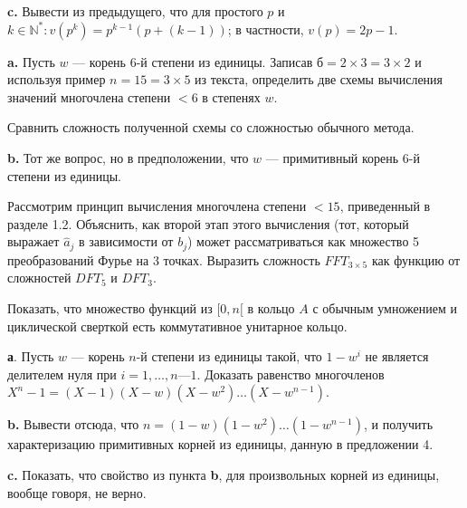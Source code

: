 \documentclass{mai_book}
\begin{document}
{\bf c.} Вывести из предыдущего, что для простого $p$ и $k \in \mathbb N^* : v(p^k) = p^{k-1}(p+(k-1))$; в частности, $v(p)=2p - 1$.

\medskip


\bigskip

{\bf a.} Пусть $w$ — корень 6-й степени из единицы. Записав $б = 2 \times 3 = 3 \times 2$ и используя пример $n = 15 = 3 \times 5$ из текста, определить две схемы вычисления значений многочлена степени $< 6$ в степенях $w$.

Сравнить сложность полученной схемы со сложностью обычного метода.

{\bf b.} Тот же вопрос, но в предположении, что $w$ — примитивный
корень 6-й степени из единицы.

\medskip


\smallskip

Рассмотрим принцип вычисления многочлена степени $< 15$, приведенный в разделе 1.2. Объяснить, как второй этап этого вычисления (тот, который выражает $\hat a_j$ в зависимости от $b_j$) может рассматриваться как множество 5 преобразований Фурье на 3 точках. Выразить сложность $FFT_{3 \times 5}$ как функцию от сложностей $DFT_5$ и $DFT_3$.

\medskip


\smallskip

Показать, что множество функций из $[0, n[$ в кольцо $A$ с обычным
умножением и циклической сверткой есть коммутативное унитарное
кольцо.

\medskip


\smallskip

{\bf а}. Пусть $w$ — корень $n$-й степени из единицы такой, что $1 - w^i$ не является делителем нуля при $i = 1,\ldots,n — 1$. Доказать равенство многочленов $X^n -1=(X-1)(X-w)(X-w^2) \ldots (X-w^{n-1})$.\par
\newpage
{\bf b.} Вывести отсюда, что $n = (1 - w)(1 - w^2) \ldots (1 - w^{n-1})$, и
получить характеризацию примитивных корней из единицы, данную в
предложении 4.

{\bf c.} Показать, что свойство из пункта {\bf b}, для произвольных корней из единицы, вообще говоря, не верно.

\bigskip
\end{document}
